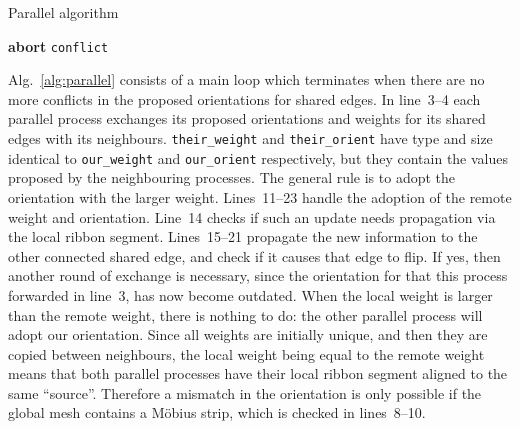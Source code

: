 \documentclass[oneeqnum,onethmnum,onefignum,onetabnum]{siamltex1213}
\begin{document}
\begin{algorithm}
  \caption{Parallel algorithm}
  \label{alg:parallel}
  \begin{algorithmic}[1]
    \State 
      \State {}
      \State {}
      \State 
      \ForAll {}
        \If {}
          \If {}
            \State \textbf{abort}
          \EndIf
        \ElsIf {}
          \State 
          \State 
          \If {}
            \State 
            \State 
            \If {}
              \State 
            \EndIf
            \State 
            \State 
          \EndIf
        \EndIf
      \EndFor
      \State \texttt{conflict}  
    \EndWhile
  \end{algorithmic}
\end{algorithm}

Alg.~\ref{alg:parallel} consists of a main loop which terminates when there
are no more conflicts in the proposed orientations for shared edges. In
line~3--4 each parallel process exchanges its proposed orientations
and weights for its shared edges with its
neighbours. \texttt{their\_weight} and \texttt{their\_orient} have
type and size identical to \texttt{our\_weight} and
\texttt{our\_orient} respectively, but they contain the values
proposed by the
neighbouring processes. The general rule is to adopt the orientation with
the larger weight.  Lines~11--23 handle the adoption of the remote weight and
orientation. Line~14 checks if such an update needs propagation via the
local ribbon segment. Lines~15--21 propagate the new information to the
other connected shared edge, and check if it causes that edge to flip.
If yes, then
another round of exchange is necessary, since the orientation for 
that this process forwarded in line~3, has now become outdated. When the
local weight is larger than the remote weight, there is nothing to do: the
other parallel process will adopt our orientation.  Since all weights are
initially unique, and then they are copied between neighbours, the local
weight being equal to the remote weight means that both parallel processes
have their local ribbon segment aligned to the same ``source''. Therefore a
mismatch in the orientation is only possible if the global mesh contains a
Möbius strip, which is checked in lines~8--10.
\end{document}

